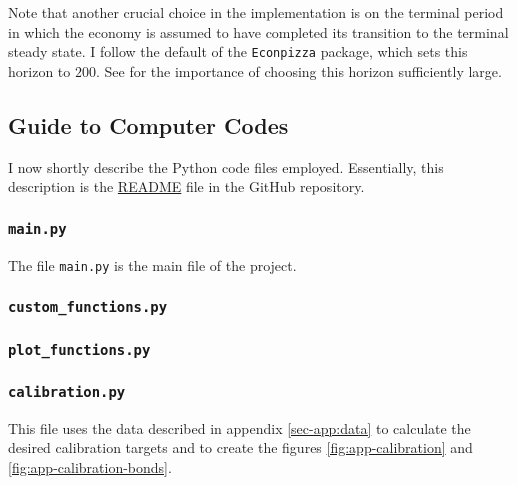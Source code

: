 \documentclass[a4paper,12pt]{article} %
\numberwithin{equation}{section} %
\numberwithin{figure}{section}
\numberwithin{table}{section}
\begin{document}
\begin{refsection}
\begin{appendices}
Note that another crucial choice in the implementation is on the terminal period in which the economy is assumed to have completed its transition to the terminal steady state. I follow the default of the \texttt{Econpizza} package, which sets this horizon to $200$. See \textcite{auclert2021} for the importance of choosing this horizon sufficiently large.

\subsection{Guide to Computer Codes}
\label{sec-app:codes-guide}

I now shortly describe the Python code files employed. Essentially, this description is the \href{https://github.com/andkound98/master-thesis/blob/main/README.md}{README} file in the GitHub repository. 

\subsubsection*{\texttt{main.py}}

The file \texttt{main.py} is the main file of the project.

\subsubsection*{\texttt{custom\_functions.py}}

\subsubsection*{\texttt{plot\_functions.py}}

\subsubsection*{\texttt{calibration.py}}

This file uses the data described in appendix \ref{sec-app:data} to calculate the desired calibration targets and to create the figures \ref{fig:app-calibration} and \ref{fig:app-calibration-bonds}.


\end{appendices}
\end{refsection}
\end{document}
